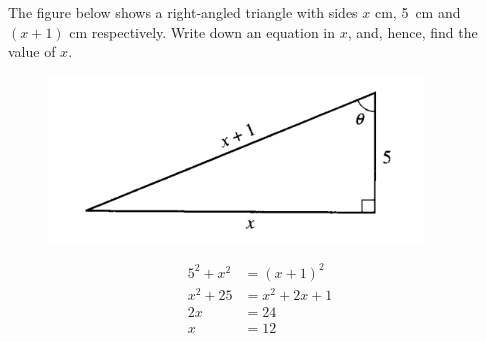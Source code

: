 \documentclass[12pt, answers]{exam}
\newcommand{\cm}{\centi\metre}
\begin{document}
\begin{questions}

\question The figure below shows a right-angled triangle with sides $x$ \si{\cm}, \qty{5}{\cm} and $(x + 1)$ \si{\cm} respectively.
Write down an equation in $x$, and, hence, find the value of $x$.
\begin{figure}[htpb]
    \centering
    \includegraphics{triq6.png}
    \label{fig:q6}
\end{figure}
\begin{solution}
\begin{align*}
    5^2 + x^2 &= \left(x + 1\right)^2 \\
    x^2 + 25 &= x^2 + 2x + 1 \\
    2x &= 24 \\
    x &= 12
\end{align*}
\end{solution}


\end{questions}
\end{document}
